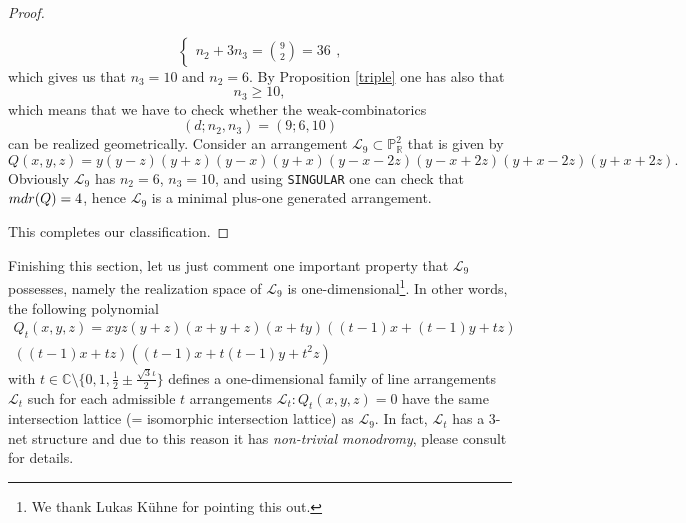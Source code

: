 \documentclass[12pt]{article}
\theoremstyle{plain}
\theoremstyle{definition}
\begin{document}
\begin{proof}
\begin{enumerate}
\[\begin{cases}
      n_{2} + 3n_{3} = \binom{9}{2}=36
    \end{cases},\]
    which gives us that $n_{3}=10$ and $n_{2}=6$.
    By Proposition \ref{triple} one has also that
    $$n_{3} \geq 10,$$
    which means that we have to check whether the weak-combinatorics 
    $$(d;n_{2},n_{3}) = (9;6,10)$$
    can be realized geometrically. Consider an arrangement $\mathcal{L}_{9} \subset \mathbb{P}^{2}_{\mathbb{R}}$ that is given by
    $$Q(x,y,z) = y(y-z)(y+z)(y-x)(y+x)(y-x-2z)(y-x+2z)(y+x-2z)(y+x+2z).$$
    Obviously $\mathcal{L}_{9}$ has $n_{2}=6$, $n_{3}=10$, and using \verb}SINGULAR} one can check that ${\rm mdr}(Q)=4$, hence $\mathcal{L}_{9}$ is a minimal plus-one generated arrangement.
\end{enumerate}
This completes our classification.
\end{proof}
Finishing this section, let us just comment one important property that $\mathcal{L}_{9}$ possesses, namely the realization space of $\mathcal{L}_{9}$ is one-dimensional\footnote{We thank Lukas K\"uhne for pointing this out.}. In other words, the following polynomial
\begin{multline}
\label{3net}
Q_{t}(x,y,z) = xyz(y+z)(x+y+z)(x+ty)((t-1)x+(t-1)y+tz)\\ ((t-1)x+tz)((t-1)x+t(t-1)y+t^2z)
\end{multline} 
with $t \in \mathbb{C} \setminus \bigg\{0,1, \frac{1}{2} \pm \frac{\sqrt{3}\iota}{2}\bigg\}$
defines a one-dimensional family of line arrangements $\mathcal{L}_{t}$ such for each admissible $t$ arrangements $\mathcal{L}_{t} : Q_{t}(x,y,z)=0$ have the same intersection lattice (= isomorphic intersection lattice) as $\mathcal{L}_{9}$. In fact, $\mathcal{L}_{t}$ has a $3$-net structure and due to this reason it has {\it non-trivial monodromy}, please consult \cite[Theorem 2.2]{M} for details.
\end{document}
